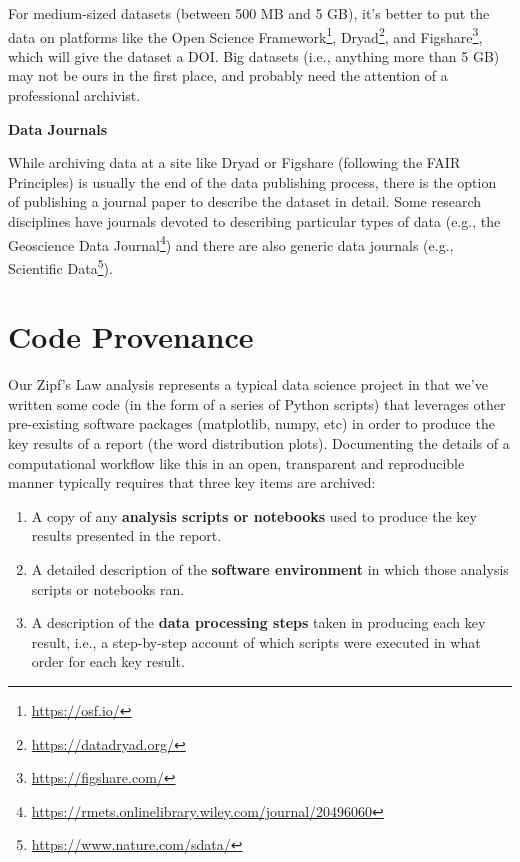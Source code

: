 \documentclass[
]{krantz}
\providecommand{\tightlist}{%
  \setlength{\itemsep}{0pt}\setlength{\parskip}{0pt}}
\renewenvironment{quote}{\begin{VF}}{\end{VF}}
\renewcommand{\href}[2]{#2\footnote{\url{#1}}}
\begin{document}
For medium-sized datasets (between 500 MB and 5 GB),
it's better to put the data on platforms
like the \href{https://osf.io/}{Open Science Framework}, \href{https://datadryad.org/}{Dryad}, and \href{https://figshare.com/}{Figshare},
which will give the dataset a DOI.
Big datasets (i.e., anything more than 5 GB)
may not be ours in the first place,
and probably need the attention of a professional archivist.

\begin{quote}
\textbf{Data Journals}

While archiving data at a site like Dryad or Figshare (following the FAIR Principles)
is usually the end of the data publishing process,
there is the option of publishing a journal paper to describe the dataset in detail.
Some research disciplines have journals devoted
to describing particular types of data
(e.g., the \href{https://rmets.onlinelibrary.wiley.com/journal/20496060}{Geoscience Data Journal})
and there are also generic data journals
(e.g., \href{https://www.nature.com/sdata/}{Scientific Data}).
\end{quote}

\hypertarget{provenance-code}{%
\section{Code Provenance}\label{provenance-code}}

Our Zipf's Law analysis represents a typical data science project
in that we've written some code (in the form of a series of Python scripts)
that leverages other pre-existing software packages (matplotlib, numpy, etc)
in order to produce the key results of a report (the word distribution plots).
Documenting the details of a computational workflow like this
in an open, transparent and reproducible manner
typically requires that three key items are archived:

\begin{enumerate}
\def\labelenumi{\arabic{enumi}.}
\tightlist
\item
  A copy of any \textbf{analysis scripts or notebooks} used to produce the key results
  presented in the report.
\item
  A detailed description of the \textbf{software environment}
  in which those analysis scripts or notebooks ran.
\item
  A description of the \textbf{data processing steps} taken in producing each key result,
  i.e., a step-by-step account of which scripts were executed in what order
  for each key result.
\end{enumerate}
\end{document}

